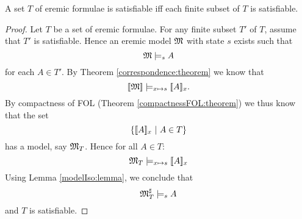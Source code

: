 \begin{theorem}
A set $T$ of eremic formulae is satisfiable iff each finite subset of
$T$ is satisfiable.
\end{theorem}
\begin{proof}
Let $T$ be a set of eremic formulae.  For any finite subset $T'$ of
$T$, assume that $T'$ is satisfiable.  Hence an eremic model $\frak{M}$
with state $s$ exists such that
\[
   \frak{M} \models_s A
\]
for each $A \in T'$. By Theorem \ref{correspondence:theorem} we know that
\[
   \lbrack\!\lbrack \frak{M} \rbrack\!\rbrack \models_{x \mapsto s} \lbrack\!\lbrack A \rbrack\!\rbrack_x.
\]
By compactness of FOL (Theorem \ref{compactnessFOL:theorem}) we thus know
that the set
\[
   \{ \lbrack\!\lbrack A \rbrack\!\rbrack_x\ |\ A \in T\}
\]
has a model, say $\frak{M}_{T}$. Hence for all $A \in T$:
\[
   \frak{M}_T \models_{x \mapsto s} \lbrack\!\lbrack A \rbrack\!\rbrack_x
\]
Using Lemma \ref{modelIso:lemma}, we conclude that
\[
   \frak{M}_T^{\sharp} \models_s A
\]
and $T$ is satisfiable.
\end{proof}

